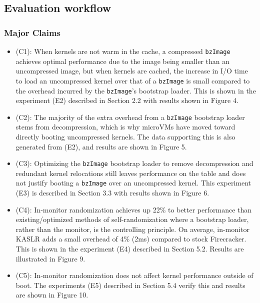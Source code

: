 \documentclass[sigplan,twocolumn]{acmart}
\begin{document}
\subsection{Evaluation workflow}
{%

\subsubsection{Major Claims}

\begin{itemize}
    \item (C1): When kernels are not warm in the cache, a compressed \texttt{bzImage} achieves optimal performance
    due to the image being smaller than an uncompressed image, but when kernels are cached, the increase in I/O time
    to load an uncompressed kernel over that of a \texttt{bzImage} is small compared to the overhead incurred by the
    \texttt{bzImage}'s bootstrap loader. This is shown in the experiment (E2) described in Section 2.2 with results 
    shown in Figure 4.
    \item (C2): The majority of the extra overhead from a \texttt{bzImage} bootstrap loader stems from decompression, 
    which is why microVMs have moved toward directly booting uncompressed kernels. The data supporting this is also 
    generated from (E2), and results are shown in Figure 5.
    \item (C3): Optimizing the \texttt{bzImage} bootstrap loader to remove decompression and redundant kernel 
    relocations still leaves performance on the table and does not justify booting a \texttt{bzImage} over
    an uncompressed kernel. This experiment (E3) is described in Section 3.3 with results shown in Figure 6.
    \item (C4): In-monitor randomization achieves up 22\% to better performance than existing/optimized methods of self-randomization 
    where a bootstrap loader, rather than the monitor, is the controlling principle. On average, in-monitor KASLR adds a small overhead of 4\% (2ms)
    compared to stock Firecracker. This is shown in the experiment (E4) described in Section 5.2. Results are illustrated in Figure 9.
    \item (C5): In-monitor randomization does not affect kernel performance outside of boot. 
    The experiments (E5) described in Section 5.4 verify this and results are shown in Figure 10.
\end{itemize}

}
\end{document}
